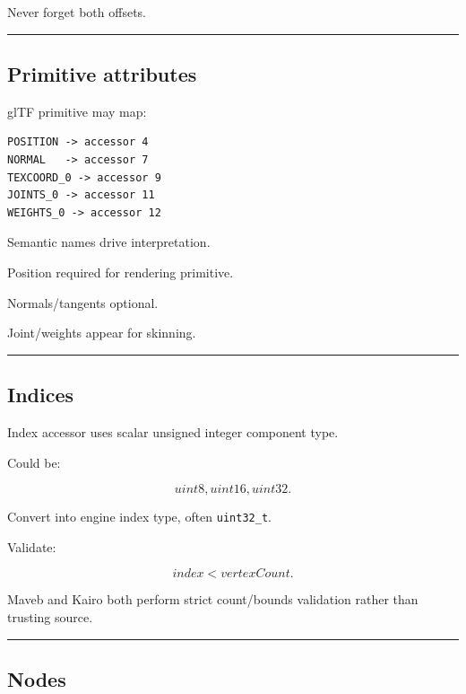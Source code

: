 Never forget both offsets.

\begin{center}\rule{0.5\linewidth}{0.5pt}\end{center}

\subsection{Primitive attributes}\label{04-visual-computing-ii-ch041-primitive-attributes}

\hypertarget{04-visual-computing-ii-ch041-primitive-attributes}{}

glTF primitive may map:

\begin{verbatim}
POSITION -> accessor 4
NORMAL   -> accessor 7
TEXCOORD_0 -> accessor 9
JOINTS_0 -> accessor 11
WEIGHTS_0 -> accessor 12
\end{verbatim}

Semantic names drive interpretation.

Position required for rendering primitive.

Normals/tangents optional.

Joint/weights appear for skinning.

\begin{center}\rule{0.5\linewidth}{0.5pt}\end{center}

\subsection{Indices}\label{04-visual-computing-ii-ch041-indices}

\hypertarget{04-visual-computing-ii-ch041-indices}{}

Index accessor uses scalar unsigned integer component type.

Could be:

\[
uint8,uint16,uint32.
\]

Convert into engine index type, often \texttt{uint32\_t}.

Validate:

\[
index<vertexCount.
\]

Maveb and Kairo both perform strict count/bounds validation rather than trusting source.

\begin{center}\rule{0.5\linewidth}{0.5pt}\end{center}

\subsection{Nodes}\label{04-visual-computing-ii-ch041-nodes}

